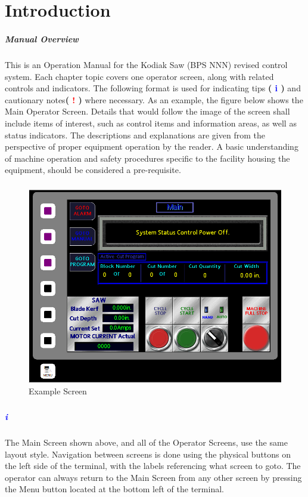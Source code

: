 \chapter{Introduction}

\paragraph{Manual Overview}

This is an Operation Manual for the Kodiak Saw (BPS NNN) revised control system. Each chapter topic covers one operator screen, along with related controls and indicators. The following format is used for indicating tips \textbf{\LARGE ( \textcolor{blue}{i} )} and cautionary notes\newline \textbf{{\LARGE ( \textcolor{red}{!} )}} where necessary. As an example, the figure below shows the Main Operator Screen. Details that would follow the image of the screen shall include items of interest, such as control items and information areas, as well as status indicators. The descriptions and explanations are given from the perspective of proper equipment operation by the reader. A basic understanding of machine operation and safety procedures specific to the facility housing the equipment, should be considered a pre-requisite.
\paragraph{}
\begin{figure}
		\centering
		\includegraphics[width=0.5\linewidth]{screen-captures/main-screen}
		\caption{Example Screen}
		\label{fig:example-screen}
\end{figure}
\paragraph{}
\paragraph*{\textbf{\LARGE \textcolor{blue}{i}}}The Main Screen shown above, and all of the Operator Screens, use the same layout style. Navigation between screens is done using the physical buttons on the left side of the terminal, with the labels referencing what screen to goto. The operator can always return to the Main Screen from any other screen by pressing the Menu button located at the bottom left of the terminal.

